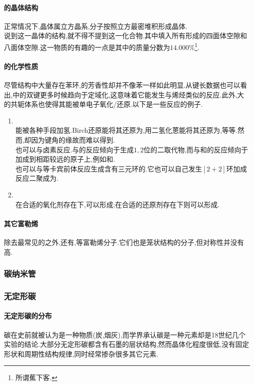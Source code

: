 \documentclass{ctexart}
\begin{document}
\paragraph{的晶体结构}
正常情况下,晶体属立方晶系,分子按照立方最密堆积形成晶体.\\
\indent 说到这一晶体的结构,就不得不提到这一化合物.其中填入所有形成的四面体空隙和八面体空隙.这一物质的有趣的一点是其中的质量分数为$14.000\%$\footnote{所谓蕉下客.}.
\paragraph{的化学性质}
尽管结构中大量存在苯环,的芳香性却并不像苯一样如此明显.从键长数据也可以看出,中的双键更多时候趋向于定域化,这意味着它能发生与烯烃类似的反应.此外,大的共轭体系也使得其能被单电子氧化/还原.以下是一些反应的例子.
\begin{enumerate}[label=\tbf{\arabic*.},topsep=0pt,parsep=0pt,itemsep=0pt,partopsep=0pt]
    \item {}\\
        能被各种手段加氢.Birch还原能将其还原为,用二氢化蒽能将其还原为,等等.然而,却因为键角的缘故而难以得到.\\
        也可以与卤素反应.与的反应倾向于生成$1,2$位的二取代物,而与和的反应倾向于加成到相距较远的原子上,例如和.\\
        也可以与等卡宾前体反应生成含有三元环的.它也可以自己发生$[2+2]$环加成反应二聚成为.
    \item {}\\
        在合适的氧化剂存在下,可以形成;在合适的还原剂存在下则可以形成.
\end{enumerate}
\paragraph{其它富勒烯}
除去最常见的之外,还有,等富勒烯分子.它们也是笼状结构的分子,但对称性并没有高.
\subsubsection{碳纳米管}
\subsubsection{无定形碳}
\paragraph{无定形碳的分布}
碳在史前就被认为是一种物质(炭,烟灰),而学界承认碳是一种元素却是18世纪几个实验的结论.大部分无定形碳都含有石墨的层状结构,然而晶体化程度很低,没有固定形状和周期性结构规律,同时经常掺杂很多其它元素.
\end{document}
